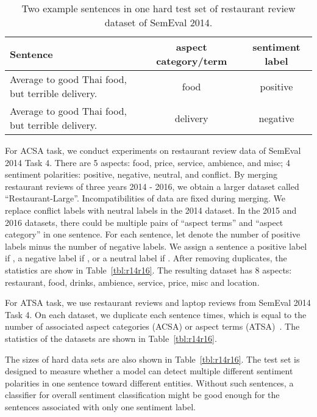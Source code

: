 \documentclass[11pt,a4paper]{article}
\begin{document}
\begin{table*}[h]
\centering
\begin{tabular}{l|c|c}
\hline
Sentence & aspect category/term & sentiment label \\
\hline
Average to good Thai food, but terrible delivery. & food & positive \\
Average to good Thai food, but terrible delivery. & delivery & negative \\
\hline
\end{tabular}
\caption{Two example sentences in one hard test set of restaurant review dataset of SemEval 2014.}
\label{tbl:testM}
\end{table*}

For ACSA task, we conduct experiments on restaurant review data of SemEval 2014 Task 4. There are 5 aspects: food, price, service, ambience, and misc; 4 sentiment polarities: positive, negative, neutral, and conflict. 
By merging restaurant reviews of three years 2014 - 2016, we obtain a larger dataset called ``Restaurant-Large''. Incompatibilities of data are fixed during merging. We replace conflict labels with neutral labels in the 2014 dataset. In the 2015 and 2016 datasets, there could be multiple pairs of ``aspect terms'' and ``aspect category'' in one sentence. For each sentence, let  denote the number of positive labels minus the number of negative labels. We assign a sentence a positive label if , a negative label if , or a neutral label if . After removing duplicates, the statistics are show in Table~\ref{tbl:r14r16}. The resulting dataset has 8 aspects: {restaurant}, {food}, {drinks}, {ambience}, {service}, {price}, {misc} and {location}.

For ATSA task, we use restaurant reviews and laptop reviews from SemEval 2014 Task 4.
On each dataset, we duplicate each sentence  times, which is equal to the number of associated aspect categories (ACSA) or aspect terms (ATSA)~\cite{Ruder:2016ve,Ruder:2016ug}. The statistics of the datasets are shown in Table~\ref{tbl:r14r16}.

The sizes of hard data sets are also shown in Table~\ref{tbl:r14r16}. The test set is designed to measure whether a model can detect multiple different sentiment polarities in one sentence toward different entities. Without such sentences, a classifier for overall sentiment classification might be good enough for the sentences associated with only one sentiment label.  
\end{document}
